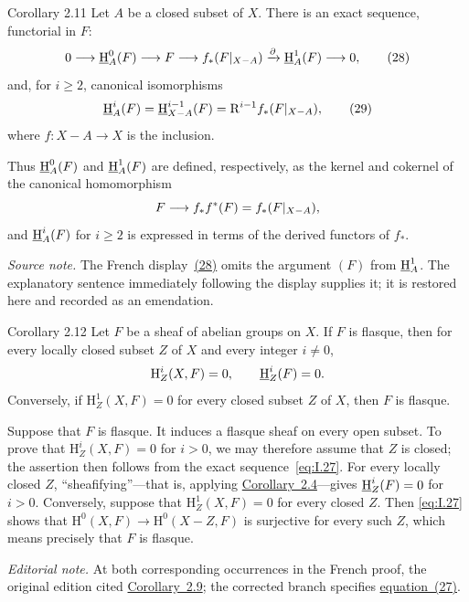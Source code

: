 \begin{sgastatement}{Corollary 2.11}
Let $A$ be a closed subset of $X$. There is an exact sequence, functorial in
$F$:
\begin{equation}
  0\longrightarrow\mathop{\underline{\mathrm H}}\nolimits_A^0(F)
  \longrightarrow F
  \longrightarrow f_*(F\vert_{X-A})
  \xrightarrow{\partial}\mathop{\underline{\mathrm H}}\nolimits_A^1(F)
  \longrightarrow0,
  \tag{28}\label{eq:I.28}
\end{equation}
and, for $i\ge2$, canonical isomorphisms
\begin{equation}
  \mathop{\underline{\mathrm H}}\nolimits_A^i(F)
  =\mathop{\underline{\mathrm H}}\nolimits_{X-A}^{i-1}(F)
  =\mathrm R^{i-1}f_*(F\vert_{X-A}),
  \tag{29}\label{eq:I.29}
\end{equation}
where $f\colon X-A\to X$ is the inclusion.
\end{sgastatement}

Thus $\mathop{\underline{\mathrm H}}\nolimits_A^0(F)$ and $\mathop{\underline{\mathrm H}}\nolimits_A^1(F)$ are defined, respectively, as the kernel
and cokernel of the canonical homomorphism
\[
  F\longrightarrow f_*f^*(F)=f_*(F\vert_{X-A}),
\]
and $\mathop{\underline{\mathrm H}}\nolimits_A^i(F)$ for $i\ge2$ is expressed in terms of the derived functors
of $f_*$.

\noindent\textit{Source note.} The French display~\hyperref[eq:I.28]{(28)} omits the argument
$(F)$ from $\mathop{\underline{\mathrm H}}\nolimits_A^1$. The explanatory sentence immediately following the
display supplies it; it is restored here and recorded as an emendation.

\begin{sgastatement}{Corollary 2.12}
Let $F$ be a sheaf of abelian groups on $X$. If $F$ is flasque,
then for every locally closed subset $Z$ of $X$ and every integer $i\ne0$,
\[
  \mathrm H_Z^i(X,F)=0,
  \qquad
  \mathop{\underline{\mathrm H}}\nolimits_Z^i(F)=0.
\]
Conversely, if $\mathrm H_Z^1(X,F)=0$ for every closed subset $Z$ of $X$,
then $F$ is flasque.
\end{sgastatement}

Suppose that $F$ is flasque. It induces a flasque sheaf on every open
subset. To prove that $\mathrm H_Z^i(X,F)=0$ for $i>0$, we may therefore
assume that $Z$ is closed; the assertion then follows from the exact
sequence~\eqref{eq:I.27}. For every locally closed $Z$, ``sheafifying''---that
is, applying \hyperref[I.2.4]{Corollary~2.4}---gives $\mathop{\underline{\mathrm H}}\nolimits_Z^i(F)=0$ for $i>0$. Conversely,
suppose that $\mathrm H_Z^1(X,F)=0$ for every closed $Z$. Then
\eqref{eq:I.27} shows that
$\mathrm H^0(X,F)\to\mathrm H^0(X-Z,F)$ is surjective for every such $Z$,
which means precisely that $F$ is flasque.

\noindent\textit{Editorial note.} At both corresponding occurrences in the
French proof, the original edition cited \hyperref[I.2.9]{Corollary~2.9}; the corrected branch
specifies \hyperref[eq:I.27]{equation~(27)}.

